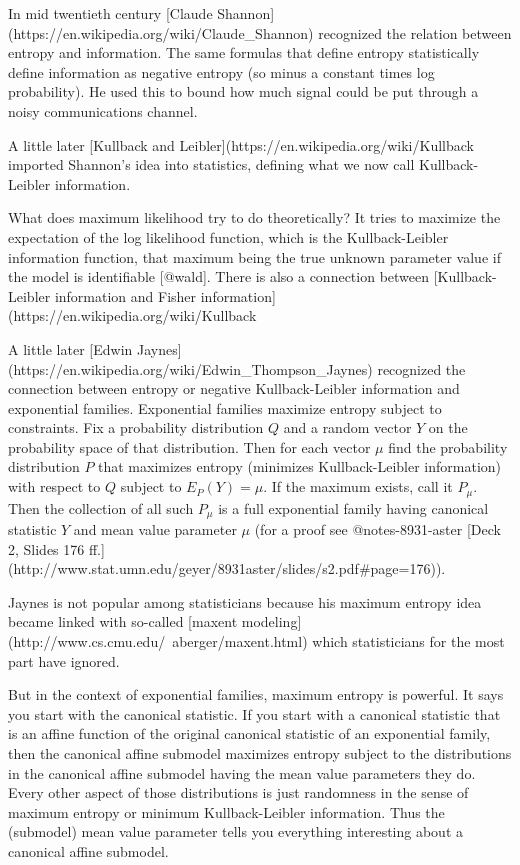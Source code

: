 \documentclass[11pt]{article}
\begin{document}
In mid twentieth century
[Claude Shannon](https://en.wikipedia.org/wiki/Claude_Shannon)
recognized the relation between entropy and information.
The same formulas that define entropy statistically define information
as negative entropy (so minus a constant times log probability).
He used this to bound how much signal could be put through a noisy
communications channel.

A little later [Kullback and
Leibler](https://en.wikipedia.org/wiki/Kullback%
imported Shannon's idea into statistics, defining what we now call
Kullback-Leibler information.

What does maximum likelihood try to do theoretically?  It tries to maximize
the expectation of the log likelihood function, which is the
Kullback-Leibler information function, that maximum being the true unknown
parameter value if the model is identifiable [@wald].
There is also a connection between [Kullback-Leibler information
and Fisher information](https://en.wikipedia.org/wiki/Kullback%

A little later
[Edwin Jaynes](https://en.wikipedia.org/wiki/Edwin_Thompson_Jaynes)
recognized
the connection between entropy or negative Kullback-Leibler information
and exponential families.  Exponential families maximize entropy subject to
constraints.  Fix a probability distribution $Q$ and a random vector $Y$ on
the probability space of that distribution.  Then for each vector $\mu$ find
the probability distribution $P$ that maximizes entropy (minimizes
Kullback-Leibler information) with respect to $Q$ subject to $E_P(Y) = \mu$.
If the maximum exists, call it $P_\mu$.  Then the collection of all such
$P_\mu$ is a full exponential family having canonical statistic $Y$ and mean
value parameter $\mu$ (for a proof see @notes-8931-aster [Deck 2, Slides 176
ff.](http://www.stat.umn.edu/geyer/8931aster/slides/s2.pdf#page=176)).

Jaynes is not popular among statisticians because his maximum entropy
idea became linked with so-called
[maxent modeling](http://www.cs.cmu.edu/~aberger/maxent.html)
which statisticians for the most part have ignored.

But in the context of exponential families, maximum entropy is powerful.
It says you start with the canonical statistic.  If you start with a canonical
statistic that is an affine function of the original canonical statistic
of an exponential family, then the canonical affine submodel maximizes
entropy subject to the distributions in the canonical affine submodel
having the mean value parameters they do.  Every other aspect of those
distributions is just randomness in the sense of maximum entropy or
minimum Kullback-Leibler information.  Thus the (submodel)
mean value parameter tells you everything interesting about a canonical
affine submodel.
\end{document}

